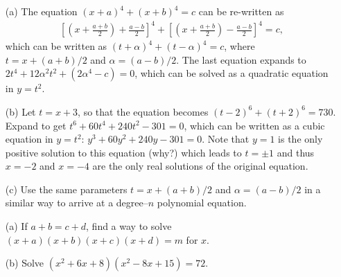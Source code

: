 \documentclass[12pt,a4paper]{memoir}
\theoremstyle{definition}
\begin{document}
\begin{solution}[name=Solution by Parviz Shahriari]
	\begin{itemize}
		\item[(a)] The equation $(x+a)^4+(x+b)^4=c$ can be re-written as
		\begin{align*}
			\left[\left(x+\frac{a+b}{2}\right) + \frac{a-b}{2}\right]^4 + \left[\left(x+\frac{a+b}{2}\right) - \frac{a-b}{2}\right]^4 =c,
		\end{align*}
		which can be written as $(t + \alpha)^4 + (t - \alpha)^4 = c$, where $t = x + (a+b)/2$ and $\alpha = (a-b)/2$. The last equation expands to $2t^4 + 12\alpha^2t^2 + (2\alpha^4 - c) = 0$, which can be solved as a quadratic equation in $y=t^2$.
		\item[(b)] Let $t=x+3$, so that the equation becomes $(t-2)^6 + (t+2)^6 = 730$. Expand to get $t^6+60t^4+240t^2-301=0$, which can be written as a cubic equation in $y=t^2$: $y^3+60y^2+240y-301=0$. Note that $y=1$ is the only positive solution to this equation (why?) which leads to $t= \pm 1$ and thus $x=-2$ and $x=-4$ are the only real solutions of the original equation.
		\item[(c)] Use the same parameters $t = x + (a+b)/2$ and $\alpha = (a-b)/2$ in a similar way to arrive at a degree--$n$ polynomial equation.
	\end{itemize}
\end{solution}


\begin{tcolorbox}
	\begin{question}
		\begin{itemize}
			\item[(a)] If $a+b=c+d$, find a way to solve $(x+a)(x+b)(x+c)(x+d)=m$ for $x$.
			\item[(b)] Solve $(x^2+6x+8)(x^2-8x+15)=72$.
		\end{itemize}
	\end{question}
\end{tcolorbox}
\end{document}
